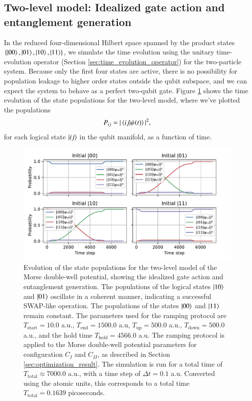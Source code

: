 \documentclass{subfiles}
\begin{document}
\subsection{Two-level model: Idealized gate action and entanglement generation}
In the reduced four-dimensional Hilbert space spanned by the product states $\{\ket{00}, \ket{01}, \ket{10}, \ket{11}\}$, we simulate the time evolution using the unitary time-evolution operator (Section \ref{sec:time_evolution_operator}) for the two-particle system. Because only the first four states are active, there is no possibility for population leakage to higher order states outside the qubit subspace, and we can expect the system to behave as a perfect two-qubit gate. Figure \ref{fig:time_evolution_2_basefunctions} shows the time evolution of the state populations for the two-level model, where we've plotted the populations 
\begin{align*}
    P_{ij} = |\braket{ij| \psi(t)}|^2,
\end{align*}
for each logical state $\ket{ij}$ in the qubit manifold, as a function of time.
\begin{figure}[h!]
    \centering
    \includegraphics[width=1.0\textwidth]{figs/time_evolution_2_basefunctions_2506_SWAP.pdf}
    \caption{Evolution of the state populations for the two-level model of the Morse double-well potential, showing the idealized gate action and entanglement generation. The populations of the logical states $\ket{10}$ and $\ket{01}$ oscillate in a coherent manner, indicating a successful SWAP-like operation. The populations of the states $\ket{00}$ and $\ket{11}$ remain constant. The parameters used for the ramping protocol are $T_{\text{start}} = 10.0$ a.u., $T_{\text{end}} = 1500.0$ a.u, $T_{\text{up}} = 500.0$ a.u., $T_{\text{down}} = 500.0$ a.u., and the hold time $T_{\text{hold}} = 4566.0$ a.u. The ramping protocol is applied to the Morse double-well potential parameters for configuration $C_I$ and $C_{II}$, as described in Section \ref{sec:optimization_result}. The simulation is run for a total time of $T_{\text{total}} \approx 7000.0$ a.u., with a time step of $\Delta t = 0.1$ a.u. Converted using the atomic units, this corresponds to a total time $T_{\text{total}}=0.1639$ picoseconds.}
    \label{fig:time_evolution_2_basefunctions}
\end{figure}
\\ 
\end{document}
